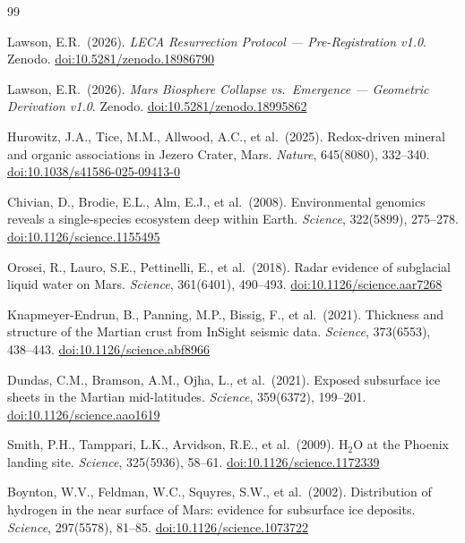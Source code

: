 \documentclass[11pt, a4paper]{article}
\begin{document}
\begin{thebibliography}{99}

Lawson, E.R.\ (2026).
\textit{LECA Resurrection Protocol ---
Pre-Registration v1.0}.
Zenodo.
\href{https://doi.org/10.5281/zenodo.18986790}
{doi:10.5281/zenodo.18986790}

Lawson, E.R.\ (2026).
\textit{Mars Biosphere Collapse vs.\
Emergence --- Geometric Derivation
v1.0}.
Zenodo.
\href{https://doi.org/10.5281/zenodo.18995862}
{doi:10.5281/zenodo.18995862}

Hurowitz, J.A., Tice, M.M., Allwood,
A.C., et al.\ (2025).
Redox-driven mineral and organic
associations in Jezero Crater, Mars.
\textit{Nature}, 645(8080), 332--340.
\href{https://doi.org/10.1038/s41586-025-09413-0}
{doi:10.1038/s41586-025-09413-0}

Chivian, D., Brodie, E.L., Alm, E.J.,
et al.\ (2008).
Environmental genomics reveals a
single-species ecosystem deep within Earth.
\textit{Science}, 322(5899), 275--278.
\href{https://doi.org/10.1126/science.1155495}
{doi:10.1126/science.1155495}

Orosei, R., Lauro, S.E., Pettinelli, E.,
et al.\ (2018).
Radar evidence of subglacial liquid
water on Mars.
\textit{Science}, 361(6401), 490--493.
\href{https://doi.org/10.1126/science.aar7268}
{doi:10.1126/science.aar7268}

Knapmeyer-Endrun, B., Panning, M.P.,
Bissig, F., et al.\ (2021).
Thickness and structure of the
Martian crust from InSight seismic data.
\textit{Science}, 373(6553), 438--443.
\href{https://doi.org/10.1126/science.abf8966}
{doi:10.1126/science.abf8966}

Dundas, C.M., Bramson, A.M., Ojha, L.,
et al.\ (2021).
Exposed subsurface ice sheets in the
Martian mid-latitudes.
\textit{Science}, 359(6372), 199--201.
\href{https://doi.org/10.1126/science.aao1619}
{doi:10.1126/science.aao1619}

Smith, P.H., Tamppari, L.K., Arvidson,
R.E., et al.\ (2009).
H$_2$O at the Phoenix landing site.
\textit{Science}, 325(5936), 58--61.
\href{https://doi.org/10.1126/science.1172339}
{doi:10.1126/science.1172339}

Boynton, W.V., Feldman, W.C., Squyres,
S.W., et al.\ (2002).
Distribution of hydrogen in the near
surface of Mars: evidence for subsurface
ice deposits.
\textit{Science}, 297(5578), 81--85.
\href{https://doi.org/10.1126/science.1073722}
{doi:10.1126/science.1073722}


\end{thebibliography}
\end{document}
